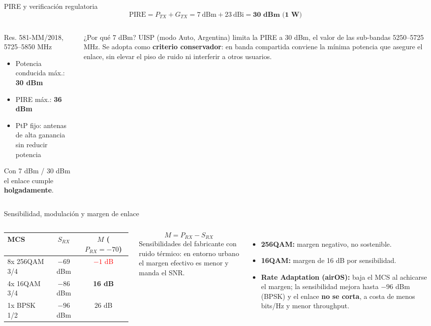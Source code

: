 \begin{frame}{PIRE y verificación regulatoria}
  \[
    \text{PIRE} = P_{TX} + G_{TX} = 7\ \text{dBm} + 23\ \text{dBi} = \textbf{30 dBm (1 W)}
  \]
  \begin{columns}[T]
    \begin{block}{Res. 581-MM/2018, 5725--5850 MHz}
      \small
      \begin{itemize}
        \item Potencia conducida máx.: \textbf{30 dBm}
        \item PIRE máx.: \textbf{36 dBm}
        \item PtP fijo: antenas de alta ganancia sin reducir potencia
      \end{itemize}
      Con 7 dBm / 30 dBm el enlace cumple \textbf{holgadamente}.
    \end{block}
    \begin{alertblock}{¿Por qué 7 dBm?}
      \small
      UISP (modo Auto, Argentina) limita la PIRE a 30 dBm, el valor de las sub-bandas
      5250--5725 MHz. Se adopta como \textbf{criterio conservador}: en banda compartida
      conviene la mínima potencia que asegure el enlace, sin elevar el piso de ruido
      ni interferir a otros usuarios.
    \end{alertblock}
  \end{columns}
\end{frame}

\begin{frame}{Sensibilidad, modulación y margen de enlace}
  \begin{columns}[T]
    \small
    \begin{tabular}{@{}lcc@{}}
      \toprule
      \textbf{MCS} & $S_{RX}$ & $M$ ($P_{RX}=-70$) \\ \midrule
      8x 256QAM 3/4 & $-69$ dBm & \textcolor{red}{$-1$ dB} \\
      4x 16QAM 3/4  & $-86$ dBm & \textcolor{verde}{\textbf{16 dB}} \\
      1x BPSK 1/2   & $-96$ dBm & 26 dB \\
      \bottomrule
    \end{tabular}
    \[ M = P_{RX} - S_{RX} \]
    {\scriptsize Sensibilidades del fabricante con ruido térmico: en entorno urbano el margen
    efectivo es menor y manda el SNR.}
    \small
    \begin{itemize}
      \item \textbf{256QAM:} margen negativo, no sostenible.
      \item \textbf{16QAM:} margen de 16 dB por sensibilidad.
      \item \textbf{Rate Adaptation (airOS):} baja el MCS al achicarse el margen; la
            sensibilidad mejora hasta $-96$ dBm (BPSK) y el enlace \textbf{no se corta},
            a costa de menos bits/Hz y menor throughput.
    \end{itemize}
  \end{columns}
\end{frame}

